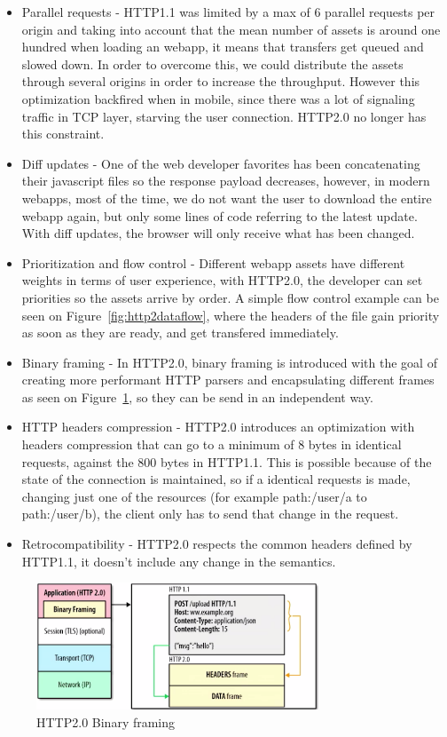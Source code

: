 \begin{itemize}
  \item Parallel requests - HTTP1.1 was limited by a max of 6 parallel requests per origin and taking into account that the mean number of assets is around one hundred when loading an webapp, it means that transfers get queued and slowed down. In order to overcome this, we could distribute the assets through several origins in order to increase the throughput. However this optimization backfired when in mobile, since there was a lot of signaling traffic in TCP layer, starving the user connection. HTTP2.0 no longer has this constraint.
  \item Diff updates - One of the web developer favorites has been concatenating their javascript files so the response payload decreases, however, in modern webapps, most of the time, we do not want the user to download the entire webapp again, but only some lines of code referring to the latest update. With diff updates, the browser will only receive what has been changed.
  \item Prioritization and flow control - Different webapp assets have different weights in terms of user experience, with HTTP2.0, the developer can set priorities so the assets arrive by order.  A simple flow control example can be seen on Figure~\ref{fig:http2dataflow}, where the headers of the file gain priority as soon as they are ready, and get transfered immediately. 
  \item Binary framing - In HTTP2.0, binary framing is introduced with the goal of creating more performant HTTP parsers and encapsulating different frames as seen on Figure~\ref{fig:binaryframing}, so they can be send in an independent way.
  \item HTTP headers compression - HTTP2.0 introduces an optimization with headers compression\cite{Ruellan2013} that can go to a minimum of 8 bytes in identical requests, against the 800 bytes in HTTP1.1. This is possible because of the state of the connection is maintained, so if a identical requests is made, changing just one of the resources (for example path:/user/a to path:/user/b), the client only has to send that change in the request.
  \item Retrocompatibility - HTTP2.0 respects the common headers defined by HTTP1.1, it doesn't include any change in the semantics.
\end{itemize}

\begin{figure}[hb]
  \centering
  \includegraphics[width=0.75\textwidth]{img/http2binaryframing.png}
  \caption{HTTP2.0 Binary framing}
  \label{fig:binaryframing}
\end{figure}

